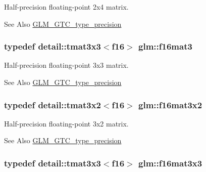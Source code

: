 Half-\/precision floating-\/point 2x4 matrix. 

\begin{DoxySeeAlso}{See Also}
\hyperlink{group__gtc__type__precision}{G\-L\-M\-\_\-\-G\-T\-C\-\_\-type\-\_\-precision} 
\end{DoxySeeAlso}
\hypertarget{group__gtc__type__precision_ga565f29588755e09a686049d0f0c91af5}{
\subsubsection[{f16mat3}]{\setlength{\rightskip}{0pt plus 5cm}typedef detail\-::tmat3x3$<$f16$>$ {\bf glm\-::f16mat3}}}\label{group__gtc__type__precision_ga565f29588755e09a686049d0f0c91af5}


Half-\/precision floating-\/point 3x3 matrix. 

\begin{DoxySeeAlso}{See Also}
\hyperlink{group__gtc__type__precision}{G\-L\-M\-\_\-\-G\-T\-C\-\_\-type\-\_\-precision} 
\end{DoxySeeAlso}
\hypertarget{group__gtc__type__precision_ga52ebf7495711e769a9191a10f668a28b}{
\subsubsection[{f16mat3x2}]{\setlength{\rightskip}{0pt plus 5cm}typedef detail\-::tmat3x2$<$f16$>$ {\bf glm\-::f16mat3x2}}}\label{group__gtc__type__precision_ga52ebf7495711e769a9191a10f668a28b}


Half-\/precision floating-\/point 3x2 matrix. 

\begin{DoxySeeAlso}{See Also}
\hyperlink{group__gtc__type__precision}{G\-L\-M\-\_\-\-G\-T\-C\-\_\-type\-\_\-precision} 
\end{DoxySeeAlso}
\hypertarget{group__gtc__type__precision_gab97d7f311dd03dcbce714197878685fa}{
\subsubsection[{f16mat3x3}]{\setlength{\rightskip}{0pt plus 5cm}typedef detail\-::tmat3x3$<$f16$>$ {\bf glm\-::f16mat3x3}}}\label{group__gtc__type__precision_gab97d7f311dd03dcbce714197878685fa}


